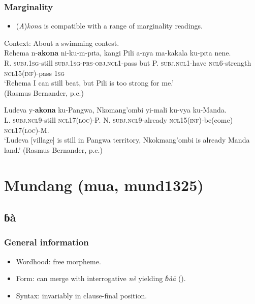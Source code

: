 \subsubsection{Marginality}\label{appendixMandaMarginal}
\begin{itemize}
	\item (\textit{A})\textit{kona} is compatible with a range of marginality readings.
\end{itemize}

\begin{exe}
	\ex\label{exAppendixMandaMarginal1}
	Context: About a swimming contest.\\
	\gll 
	Rehema n-\textbf{akona} ni-ku-m-pɪta, kangi Pili a-nya ma-kakala ku-pɪta nene.\\
	R. \textsc{subj}.1\textsc{sg}-still \textsc{subj}.1\textsc{sg}-\textsc{prs}-\textsc{obj}.\textsc{ncl}1-pass but P. \textsc{subj}.\textsc{ncl}1-have \textsc{ncl}6-strength \textsc{ncl}15(\textsc{inf})-pass 1\textsc{sg}\\
	\glt \lq Rehema I can still beat, but Pili is too strong for me.'
	\\(Rasmus Bernander, p.c.)
	
	\ex\label{exAppendixMandaMarginal2}
	\gll Ludeva y-\textbf{akona} ku-Pangwa, Nkomang'ombi yi-mali ku-vya ku-Manda.\\
	L. \textsc{subj}.\textsc{ncl}9-still \textsc{ncl}17(\textsc{loc})-P. N. \textsc{subj}.\textsc{ncl}9-already \textsc{ncl}15(\textsc{inf})-be(come) \textsc{ncl}17(\textsc{loc})-M.\\
	\glt \lq Ludeva [village] is still in Pangwa territory, Nkokmang’ombi is already Manda land.' (Rasmus Bernander, p.c.)
\end{exe}

\section{Mundang (mua, mund1325)}
\label{appendixMundang}

\subsection{ɓà}
\subsubsection{General information}
\begin{itemize}
	\item Wordhood: free morpheme.
	\item Form: can merge with interrogative \textit{nè} yielding \textit{ɓàā} ().
	\item Syntax: invariably in clause-final position.
\end{itemize}

